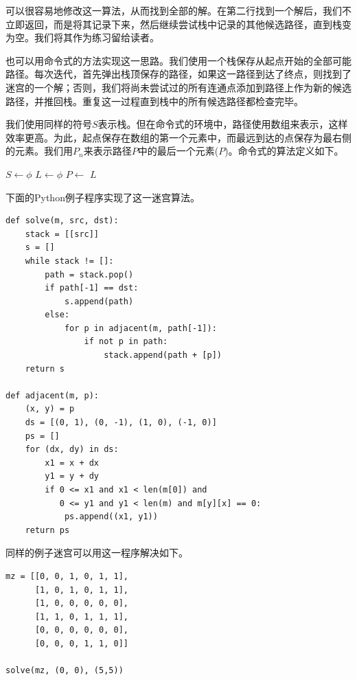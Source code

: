 \documentclass[b5paper]{ctexart}
\begin{document}
可以很容易地修改这一算法，从而找到全部的解。在第二行找到一个解后，我们不立即返回，而是将其记录下来，然后继续尝试栈中记录的其他候选路径，直到栈变为空。我们将其作为练习留给读者。

也可以用命令式的方法实现这一思路。我们使用一个栈保存从起点开始的全部可能路径。每次迭代，首先弹出栈顶保存的路径，如果这一路径到达了终点，则找到了迷宫的一个解；否则，我们将尚未尝试过的所有连通点添加到路径上作为新的候选路径，并推回栈。重复这一过程直到栈中的所有候选路径都检查完毕。

我们使用同样的符号$S$表示栈。但在命令式的环境中，路径使用数组来表示，这样效率更高。为此，起点保存在数组的第一个元素中，而最远到达的点保存为最右侧的元素。我们用$P_n$来表示路径$P$中的最后一个元素($P$)。命令式的算法定义如下。

\begin{algorithmic}[1]
  \State $S \gets \phi$
  \State {}
  \State $L \gets \phi$ 
    \State $P \gets$ 
      \State {}
    \Else
          \State {}
        \EndIf
      \EndFor
    \EndIf
  \EndWhile
  \State \Return $L$
\EndFunction
\end{algorithmic}

下面的Python例子程序实现了这一迷宫算法。

\lstset{language=Python}
\begin{lstlisting}
def solve(m, src, dst):
    stack = [[src]]
    s = []
    while stack != []:
        path = stack.pop()
        if path[-1] == dst:
            s.append(path)
        else:
            for p in adjacent(m, path[-1]):
                if not p in path:
                    stack.append(path + [p])
    return s

def adjacent(m, p):
    (x, y) = p
    ds = [(0, 1), (0, -1), (1, 0), (-1, 0)]
    ps = []
    for (dx, dy) in ds:
        x1 = x + dx
        y1 = y + dy
        if 0 <= x1 and x1 < len(m[0]) and
           0 <= y1 and y1 < len(m) and m[y][x] == 0:
            ps.append((x1, y1))
    return ps
\end{lstlisting}

同样的例子迷宫可以用这一程序解决如下。

\lstset{language=Python}
\begin{lstlisting}
mz = [[0, 0, 1, 0, 1, 1],
      [1, 0, 1, 0, 1, 1],
      [1, 0, 0, 0, 0, 0],
      [1, 1, 0, 1, 1, 1],
      [0, 0, 0, 0, 0, 0],
      [0, 0, 0, 1, 1, 0]]

solve(mz, (0, 0), (5,5))
\end{lstlisting}
\end{document}
